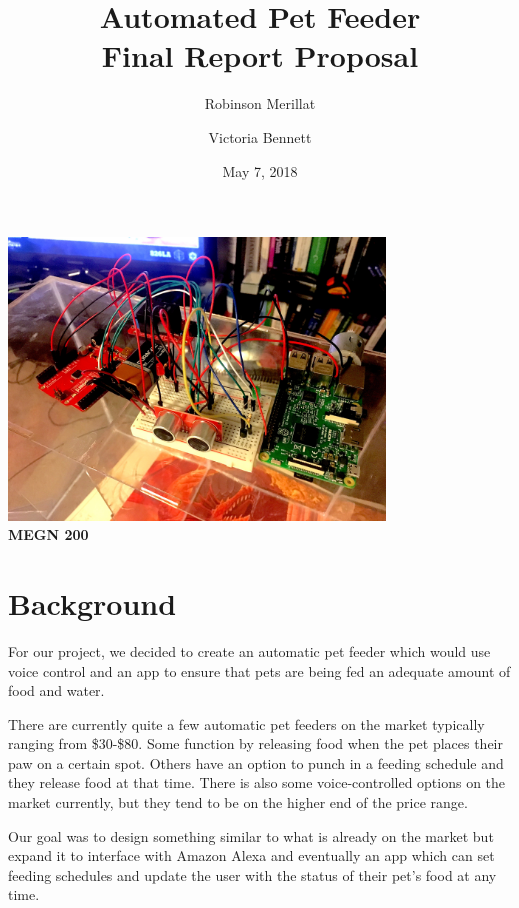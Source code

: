 \documentclass[notitlepage,11pt]{article}
\title{\textbf{Automated Pet Feeder} \\ Final Report Proposal}
\author{Robinson Merillat \and Victoria Bennett}
\date{May 7, 2018}
\begin{document}
    \maketitle
    \begin{center}             %
        \includegraphics[width=0.75\textwidth]{images/prototype.jpeg}\\ %
        \vspace{1cm}     %
        \textbf{MEGN 200}\\    %
    \end{center}

    \newpage                   %
    \tableofcontents           %
    \newpage

    \section{Background}       %
        For our project, we decided to create an automatic pet feeder which would use voice control and an app to ensure
        that pets are being fed an adequate amount of food and water. 
        
        There are currently quite a few automatic pet feeders on the market typically ranging from \$30-\$80. Some 
        function by releasing food when the pet places 
        their paw on a certain spot. Others have an option to punch in a feeding schedule and they release food at that 
        time. There is also some voice-controlled options on the market currently, but they tend to be on the higher end 
        of the price range. 
        
        Our goal was to design something similar to what is already on the market but expand it to 
        interface with Amazon Alexa and eventually an app which can set feeding schedules and update the user with the 
        status of their pet's food at any time.
\end{document}
